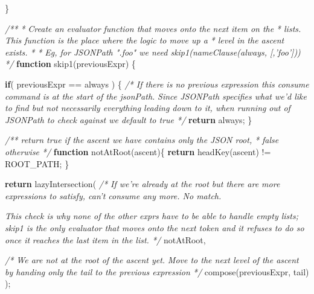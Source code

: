 \documentclass[]{article}
\newenvironment{Shaded}{}{}
\newcommand{\KeywordTok}[1]{\textcolor[rgb]{0.00,0.44,0.13}{\textbf{{#1}}}}
\newcommand{\CommentTok}[1]{\textcolor[rgb]{0.38,0.63,0.69}{\textit{{#1}}}}
\newcommand{\FunctionTok}[1]{\textcolor[rgb]{0.02,0.16,0.49}{{#1}}}
\newcommand{\NormalTok}[1]{{#1}}
\begin{document}
\begin{Shaded}
\begin{Highlighting}[]
   \NormalTok{\}            }
      
   \CommentTok{/**}
\CommentTok{    * Create an evaluator function that moves onto the next item on the }
\CommentTok{    * lists. This function is the place where the logic to move up a }
\CommentTok{    * level in the ascent exists. }
\CommentTok{    * }
\CommentTok{    * Eg, for JSONPath ".foo" we need skip1(nameClause(always, [,'foo']))}
\CommentTok{    */}
   \KeywordTok{function} \FunctionTok{skip1}\NormalTok{(previousExpr) \{}
   
   
      \KeywordTok{if}\NormalTok{( previousExpr == always ) \{}
         \CommentTok{/* If there is no previous expression this consume command }
\CommentTok{            is at the start of the jsonPath.}
\CommentTok{            Since JSONPath specifies what we'd like to find but not }
\CommentTok{            necessarily everything leading down to it, when running}
\CommentTok{            out of JSONPath to check against we default to true */}
         \KeywordTok{return} \NormalTok{always;}
      \NormalTok{\}}

      \CommentTok{/** return true if the ascent we have contains only the JSON root,}
\CommentTok{       *  false otherwise}
\CommentTok{       */}
      \KeywordTok{function} \FunctionTok{notAtRoot}\NormalTok{(ascent)\{}
         \KeywordTok{return} \FunctionTok{headKey}\NormalTok{(ascent) != ROOT_PATH;}
      \NormalTok{\}}
      
      \KeywordTok{return} \FunctionTok{lazyIntersection}\NormalTok{(}
               \CommentTok{/* If we're already at the root but there are more }
\CommentTok{                  expressions to satisfy, can't consume any more. No match.}

\CommentTok{                  This check is why none of the other exprs have to be able }
\CommentTok{                  to handle empty lists; skip1 is the only evaluator that }
\CommentTok{                  moves onto the next token and it refuses to do so once it }
\CommentTok{                  reaches the last item in the list. */}
               \NormalTok{notAtRoot,}
               
               \CommentTok{/* We are not at the root of the ascent yet.}
\CommentTok{                  Move to the next level of the ascent by handing only }
\CommentTok{                  the tail to the previous expression */} 
               \FunctionTok{compose}\NormalTok{(previousExpr, tail) }
      \NormalTok{);}
                                                                                                               

\end{Highlighting}
\end{Shaded}
\end{document}
